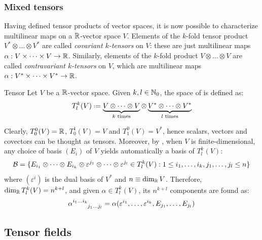 \subsubsection{Mixed tensors}

Having defined tensor products of vector spaces, it is now possible to characterize multilinear maps on a $ \mathbb{R} $-vector space $ V $. Elements of the $ k $-fold tensor product $ V^* \otimes \dots \otimes V^* $ are called \emph{covariant $ k $-tensors} on $ V $: these are just multilinear maps $ \alpha : V \times \dots \times V \rightarrow \mathbb{R} $. Similarly, elements of the $ k $-fold product $ V \otimes \dots \otimes V $ are called \emph{contravariant $ k $-tensors} on $ V $, which are multilinear maps $ \alpha : V^* \times \dots \times V^* \rightarrow \mathbb{R} $.

\begin{definition}{Tensor}{}
  Let $ V $ be a $ \mathbb{R} $-vector space. Given $ k,l \in \mathbb{N}_0 $, the space of  is defined as:
  \begin{equation}
    T^k_l(V) \defeq \underbrace{V \otimes \dots \otimes V}_{k \text{ times}} \otimes \underbrace{V^* \otimes \dots \otimes V^*}_{l \text{ times}}
  \end{equation}
\end{definition}

Clearly, $ T^0_0(V) = \mathbb{R} $, $ T^1_0(V) = V $ and $ T^0_1(V) = V^* $, hence scalars, vectors and covectors can be thought as tensors. Moreover, by , when $ V $ is finite-dimensional, any choice of basis $ (E_i) $ of $ V $ yields automatically a basis of $ T^k_l(V) $:
\begin{equation}
  \mathcal{B} = \{E_{i_1} \otimes \dots \otimes E_{i_k} \otimes \varepsilon^{j_1} \otimes \dots \otimes \varepsilon^{j_l} \in T^k_l(V) : 1 \leq i_1 , \dots , i_k , j_1 , \dots , j_l \leq n\}
\end{equation}
where $ (\varepsilon^i) $ is the dual basis of $ V^* $ and $ n \equiv \dim_{\mathbb{R}} V $. Therefore, $ \dim_{\mathbb{R}} T^k_l(V) = n^{k+l} $, and given $ \alpha \in T^k_l(V) $, its $ n^{k+l} $ components are found as:
\begin{equation}
  \tensor{\alpha}{^{i_1 \dots i_k}_{j_1 \dots j_l}} = \alpha(\varepsilon^{i_1} , \dots , \varepsilon^{i_k} , E_{j_1} , \dots , E_{j_l})
  \label{eq:tensor-components}
\end{equation}

\subsection{Tensor fields}

